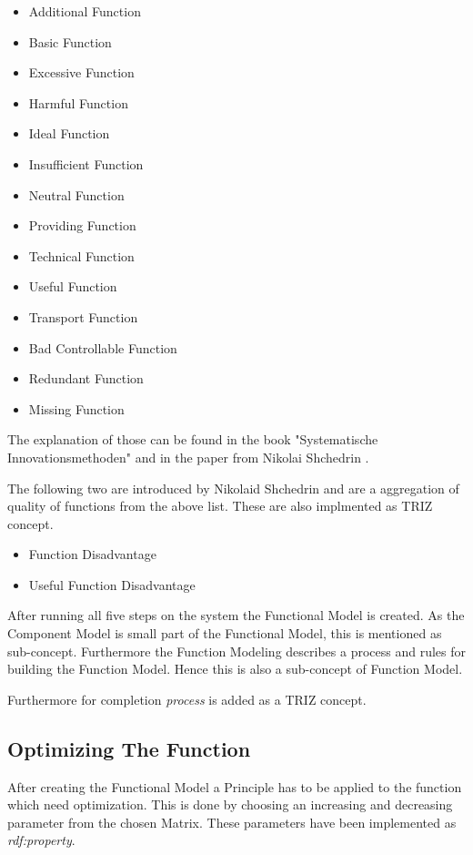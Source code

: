 \begin{itemize}[noitemsep]
    \item Additional Function
    \item Basic Function
    \item Excessive Function
    \item Harmful Function
    \item Ideal Function
    \item Insufficient Function
    \item Neutral Function
    \item Providing Function
    \item Technical Function
    \item Useful Function
    \item Transport Function
    \item Bad Controllable Function
    \item Redundant Function
    \item Missing Function
\end{itemize}

The explanation of those can be found in the book "Systematische Innovationsmethoden" \cite{KS} and in the paper from Nikolai Shchedrin \cite{WebinarFunctionAnalysis}.

The following two are introduced by Nikolaid Shchedrin and are a aggregation of quality of functions from the above list.
These are also implmented as TRIZ concept. 

\begin{itemize}[noitemsep]
    \item Function Disadvantage
    \item Useful Function Disadvantage
\end{itemize}

After running all five steps on the system the Functional Model is created. 
As the Component Model is small part of the Functional Model, this is mentioned as sub-concept. 
Furthermore the Function Modeling describes a process and rules for building the Function Model. 
Hence this is also a sub-concept of Function Model. 

Furthermore for completion \textit{process} is added as a TRIZ concept. 

\subsection{Optimizing The Function}

After creating the Functional Model a Principle has to be applied to the function which need optimization. 
This is done by choosing an increasing and decreasing parameter from the chosen Matrix. 
These parameters have been implemented as \textit{rdf:property}.

